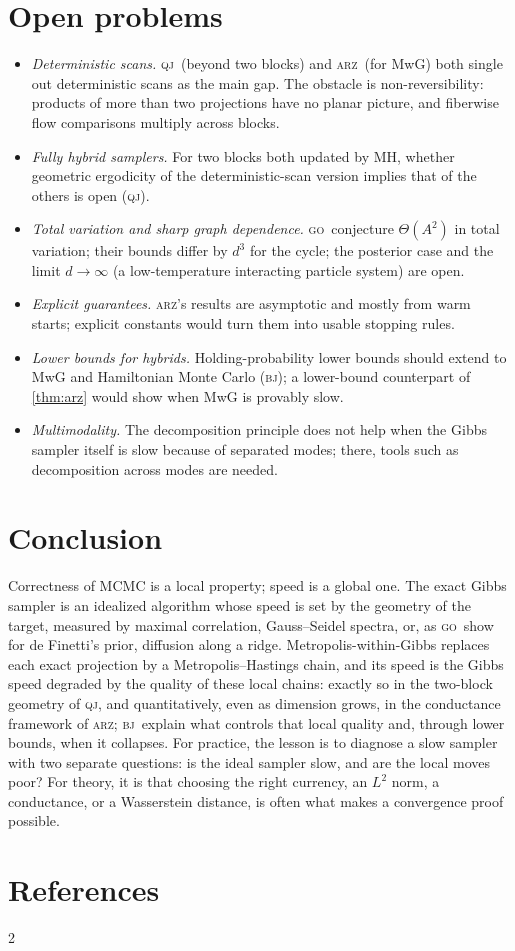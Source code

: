\documentclass[11pt]{article}
\theoremstyle{remark}
\newcommand{\QJ}{\textsc{qj}}
\newcommand{\ARZ}{\textsc{arz}}
\newcommand{\GO}{\textsc{go}}
\newcommand{\BJ}{\textsc{bj}}
\begin{document}
\section{Open problems}\label{sec:open}
\begin{itemize}[leftmargin=1.3em,itemsep=2pt]
\item \emph{Deterministic scans.} \QJ\ (beyond two blocks) and \ARZ\ (for MwG) both single out deterministic scans as the main gap. The obstacle is non-reversibility: products of more than two projections have no planar picture, and fiberwise flow comparisons multiply across blocks.
\item \emph{Fully hybrid samplers.} For two blocks both updated by MH, whether geometric ergodicity of the deterministic-scan version implies that of the others is open (\QJ).
\item \emph{Total variation and sharp graph dependence.} \GO\ conjecture $\Theta(A^2)$ in total variation; their bounds differ by $d^3$ for the cycle; the posterior case and the limit $d\to\infty$ (a low-temperature interacting particle system) are open.
\item \emph{Explicit guarantees.} \ARZ's results are asymptotic and mostly from warm starts; explicit constants would turn them into usable stopping rules.
\item \emph{Lower bounds for hybrids.} Holding-probability lower bounds should extend to MwG and Hamiltonian Monte Carlo (\BJ); a lower-bound counterpart of \cref{thm:arz} would show when MwG is provably slow.
\item \emph{Multimodality.} The decomposition principle does not help when the Gibbs sampler itself is slow because of separated modes; there, tools such as decomposition across modes \citep{madras2002} are needed.
\end{itemize}

\section{Conclusion}\label{sec:conclusion}
Correctness of MCMC is a local property; speed is a global one. The exact Gibbs sampler is an idealized algorithm whose speed is set by the geometry of the target, measured by maximal correlation, Gauss--Seidel spectra, or, as \GO\ show for de Finetti's prior, diffusion along a ridge. Metropolis-within-Gibbs replaces each exact projection by a Metropolis--Hastings chain, and its speed is the Gibbs speed degraded by the quality of these local chains: exactly so in the two-block geometry of \QJ, and quantitatively, even as dimension grows, in the conductance framework of \ARZ; \BJ\ explain what controls that local quality and, through lower bounds, when it collapses. For practice, the lesson is to diagnose a slow sampler with two separate questions: is the ideal sampler slow, and are the local moves poor? For theory, it is that choosing the right currency, an $L^2$ norm, a conductance, or a Wasserstein distance, is often what makes a convergence proof possible.

\section*{References}
\renewcommand{\bibsection}{}
\setlength{\columnsep}{18pt}
\begin{multicols}{2}


\end{multicols}
\end{document}
